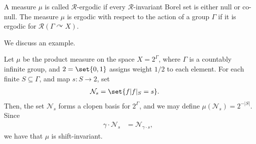 \documentclass[10pt]{mypackage}
\begin{document}
\begin{definition}
  A measure $\mu$ is called $\mathcal{R}$-ergodic if every $\mathcal{R}$-invariant Borel set is either null or co-null. The measure $\mu$ is ergodic with respect to the action of a group $\Gamma$ if it is ergodic for $\mathcal{R}\left( \Gamma\curvearrowright X \right)$.
\end{definition}
We discuss an example.

Let $\mu$ be the product measure on the space $X = 2^{\Gamma}$, where $\Gamma$ is a countably infinite group, and $2 = \set{0,1}$ assigns weight $1/2$ to each element. For each finite $S\subseteq \Gamma$, and map $s\colon S\rightarrow 2$, set
\begin{align*}
  \mathcal{N}_s &= \set{f | f|_{S} = s}.
\end{align*}
Then, the set $\mathcal{N}_s$ forms a clopen basis for $2^{\Gamma}$, and we may define $\mu\left( \mathcal{N}_s \right) = 2^{-\left\vert S \right\vert}$. Since
\begin{align*}
  \gamma\cdot \mathcal{N}_s &= \mathcal{N}_{\gamma\cdot s},
\end{align*}
we have that $\mu$ is shift-invariant.
\end{document}
